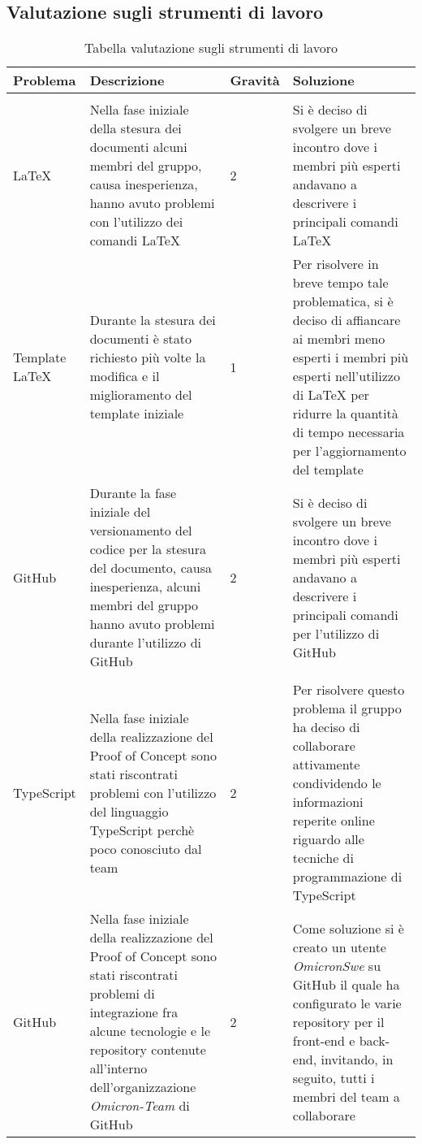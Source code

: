 \subsection{Valutazione sugli strumenti di lavoro}

{

\centering
\renewcommand{\arraystretch}{2}
\begin{longtable}{C{2cm} C{5cm} C{2cm} C{5.2cm}}
\caption{Tabella valutazione sugli strumenti di lavoro}\\
\textbf{Problema} &
\textbf{Descrizione}&
\textbf{Gravità}&
\textbf{Soluzione}\\
\endhead

\\

\LaTeX{} & Nella fase iniziale della stesura dei documenti alcuni membri del gruppo, causa inesperienza, hanno avuto problemi con l'utilizzo dei comandi \LaTeX{} & 2 & Si è deciso di svolgere un breve incontro dove i membri più esperti andavano a descrivere i principali comandi \LaTeX{} \\
Template \LaTeX{} & Durante la stesura dei documenti è stato richiesto più volte la modifica e il miglioramento del template iniziale & 1 & Per risolvere in breve tempo tale problematica, si è deciso di affiancare ai membri meno esperti i membri più esperti nell'utilizzo di \LaTeX{} per ridurre la quantità di tempo necessaria per l'aggiornamento del template \\
GitHub & Durante la fase iniziale del versionamento del codice per la stesura del documento, causa inesperienza, alcuni membri del gruppo hanno avuto problemi durante l'utilizzo di GitHub & 2 & Si è deciso di svolgere un breve incontro dove i membri più esperti andavano a descrivere i principali comandi per l'utilizzo di GitHub\\

\\

TypeScript & Nella fase iniziale della realizzazione del Proof of Concept sono stati riscontrati problemi con l'utilizzo del linguaggio TypeScript perchè poco conosciuto dal team & 2 & Per risolvere questo problema il gruppo ha deciso di collaborare attivamente condividendo le informazioni reperite online riguardo alle tecniche di programmazione di TypeScript\\

GitHub & Nella fase iniziale della realizzazione del Proof of Concept sono stati riscontrati problemi di integrazione fra alcune tecnologie e le repository contenute all'interno dell'organizzazione \textit{Omicron-Team} di GitHub & 2 & Come soluzione si è creato un utente \textit{OmicronSwe} su GitHub il quale ha configurato le varie repository per il front-end e back-end, invitando, in seguito, tutti i membri del team a collaborare


\end{longtable}
}